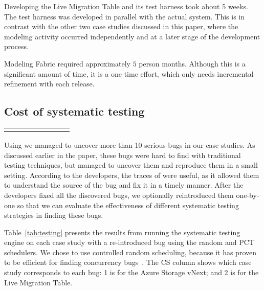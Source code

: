 Developing the Live Migration Table and its \psharp test harness took about 5 weeks. The test harness was developed in parallel with the actual system.
This is in contrast with the other two case studies discussed in this paper, where the modeling 
activity occurred independently and at a later stage of the development process.

Modeling Fabric required approximately $5$ person months. Although this is a
significant amount of time, it is a one time effort, which only needs incremental refinement with each release.

\subsection{Cost of systematic testing}
\label{sec:eval:machine_cost}

\setlength{\tabcolsep}{.72em}
\begin{table*}[t]
\small
\centering
\begin{tabular}{rl rrr rrr}
\centering

\end{tabular}
\caption{Results from running the \psharp random and PCT systematic testing schedulers for 100,000 iterations. We report: time in seconds to find a bug (Time to Bug); number of scheduling steps when a bug was found (\#SS); and if a bug was found with a particular scheduler (BF?).}
\label{tab:testing}
\end{table*}

Using \psharp we managed to uncover more than 10 serious bugs in our case studies. As discussed earlier in the paper, these bugs were hard to find with traditional testing techniques, but \psharp managed to uncover them and reproduce them in a small setting. According to the developers, the traces of \psharp were useful, as it allowed them to understand the source of the bug and fix it in a timely manner. After the developers fixed all the discovered bugs, we optionally reintroduced them one-by-one so that we can evaluate the effectiveness of different \psharp systematic testing strategies in finding these bugs.

Table~\ref{tab:testing} presents the results from running the \psharp systematic testing engine on each case study with a re-introduced bug using the random and PCT schedulers. We chose to use controlled random scheduling, because it has proven to be efficient for finding concurrency bugs~\cite{thomson2014sct, deligiannis2015psharp}. The CS column shows which case study corresponds to each bug: 1 is for the Azure Storage vNext; and 2 is for the Live Migration Table. 

